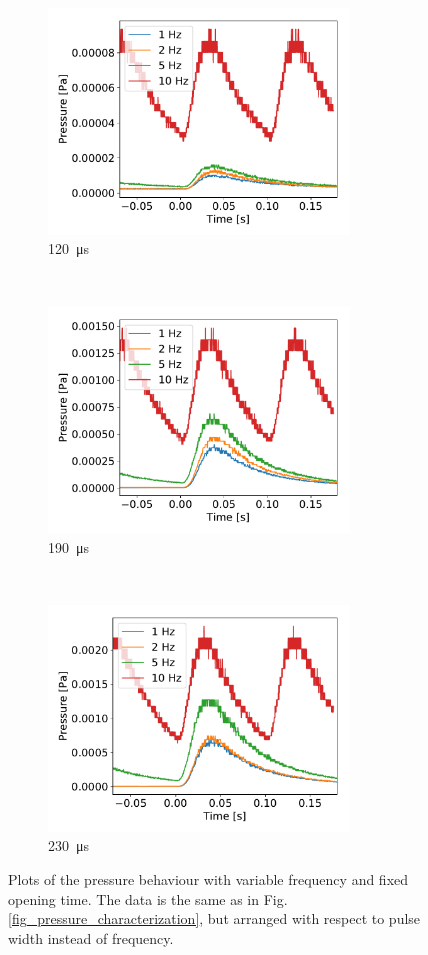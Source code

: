 \documentclass[a4paper,10pt]{article}
\begin{document}
\begin{figure}[htp!]
  \centering{}
  \begin{subfigure}[t]{0.45 \textwidth}
    \centering
    \includegraphics[height=6cm]{part1_120_width.pdf}
    \caption{\SI{120}{\micro \s}}
  \end{subfigure}
  ~
  \begin{subfigure}[t]{0.45 \textwidth}
    \centering
    \includegraphics[height=6cm]{part1_190_width.pdf}
    \caption{\SI{190}{\micro \s}}
  \end{subfigure}
  ~
  \begin{subfigure}[t]{0.45 \textwidth}
    \centering
    \includegraphics[height=6cm]{part1_230_width.pdf}
    \caption{\SI{230}{\micro \s}}
  \end{subfigure}
  \caption{Plots of the pressure behaviour with variable frequency and fixed opening time. The data is the same as in Fig. \ref{fig_pressure_characterization}, but arranged with respect to pulse width instead of frequency. }
  \label{fig_width_characterization}
\end{figure}
\end{document}
